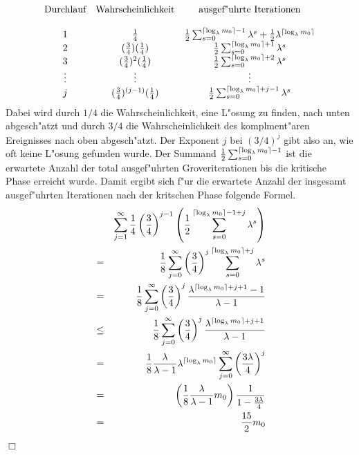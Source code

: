               $$
              \begin{array}{ccc} 
                \mbox{Durchlauf}    & \mbox{Wahrscheinlichkeit}                 & \mbox{ausgef"uhrte Iterationen} \\ 
                                    &                                           &                                 \\
                1                   & \frac{1}{4}                               & \frac{1}{2}\sum_{s=0}^{\lceil \log_{\lambda} m_0 \rceil - 1} \lambda^s + \frac{1}{2}\lambda^{\lceil \log_{\lambda} m_0 \rceil} \\ 
                2                   & (\frac{3}{4})(\frac{1}{4})                & \frac{1}{2}\sum_{s=0}^{\lceil \log_{\lambda} m_0 \rceil + 1} \lambda^s \\ 
                3                   & (\frac{3}{4})^2(\frac{1}{4})              & \frac{1}{2}\sum_{s=0}^{\lceil \log_{\lambda} m_0 \rceil + 2} \lambda^s \\ 
                \vdots              & \vdots                                    & \vdots                                    \\
                j                   & (\frac{3}{4})^{(j-1)}(\frac{1}{4})        & \frac{1}{2}\sum_{s=0}^{\lceil \log_{\lambda} m_0 \rceil + j - 1} \lambda^s
              \end{array}
              $$ 
              Dabei wird durch $1/4$ die Wahrscheinlichkeit, eine L"osung zu finden, nach unten abgesch"atzt und durch $3/4$ die Wahrscheinlichkeit des
              komplment"aren Ereignisses nach oben abgesch"atzt. Der Exponent $j$ bei $(3/4)^j$ gibt also an, wie oft keine L"osung gefunden wurde. Der Summand
              $\frac{1}{2} \sum_{s=0}^{\lceil \log_{\lambda} m_0 \rceil - 1}$ ist die erwartete Anzahl der total ausgef"uhrten Groveriterationen bis die kritische Phase erreicht wurde.
              Damit ergibt sich f"ur die erwartete Anzahl der insgesamt ausgef"uhrten Iterationen nach der kritschen Phase folgende Formel.
              \begin{eqnarray} 
                &     & \sum_{j=1}^{\infty}\frac{1}{4}\left(\frac{3}{4}\right)^{j-1} \left(\frac{1}{2}\sum_{s=0}^{\lceil \log_{\lambda} m_0 \rceil - 1 + j}\lambda^s \right) \nonumber \\ 
                & =   & \frac{1}{8}\sum_{j=0}^{\infty}\left(\frac{3}{4}\right)^j \sum_{s=0}^{\lceil \log_{\lambda} m_0 \rceil + j} \lambda^s \nonumber\\ 
                & =   & \frac{1}{8}\sum_{j=0}^{\infty}\left(\frac{3}{4}\right)^j \frac{\lambda^{\lceil \log_{\lambda} m_0 \rceil + j + 1} - 1}{\lambda - 1} \nonumber\\ 
                & \le & \frac{1}{8}\sum_{j=0}^{\infty}\left(\frac{3}{4}\right)^j \frac{\lambda^{\lceil \log_{\lambda} m_0 \rceil + j + 1}}{\lambda - 1} \nonumber\\ 
                & =   & \frac{1}{8} \frac{\lambda}{\lambda - 1} \lambda^{\lceil \log_{\lambda} m_0 \rceil} \sum_{j=0}^{\infty}\left(\frac{3\lambda}{4}\right)^j\nonumber \\
                & =   & \left(\frac{1}{8}\frac{\lambda}{\lambda - 1} m_0\right) \frac{1}{1-\frac{3\lambda}{4}} \nonumber\\ 
                & =   & \frac{15}{2} m_0 \label{schritte}
              \end{eqnarray} 
              \hfill $\Box$

